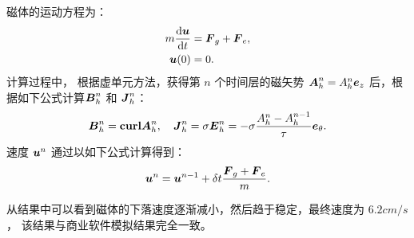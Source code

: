 \documentclass[notheorems,serif]{beamer}
\begin{document}
\begin{frame}
磁体的运动方程为：
$$
\begin{aligned}
    m\frac{\mathrm{d} \boldsymbol{u}}{\mathrm{d} t} & = \boldsymbol{F}_{g} + \boldsymbol{F}_{e},\\
\boldsymbol{u}(0) & = 0.
\end{aligned}
$$
计算过程中，
根据虚单元方法，获得第 $n$ 个时间层的磁矢势 $\boldsymbol{A}^n_h = A^n_h\boldsymbol{e}_z$ 后，根据如下公式计算$\boldsymbol{B}^n_h$ 和
$\boldsymbol{J}^n_h$：
$$
\boldsymbol{B}^n_h = \mathbf{curl} \boldsymbol{A}^n_h, \quad \boldsymbol{J}^n_h = \sigma\boldsymbol{E}^n_h = -\sigma
\frac{A^n_h - A^{n-1}_h}{\tau}\boldsymbol{e}_{\theta}.
$$
速度 $\boldsymbol{u}^n$ 通过以如下公式计算得到：
$$
\boldsymbol{u}^n = \boldsymbol{u}^{n-1} + \delta t \frac{\boldsymbol{F}_{g} + \boldsymbol{F}_{e}}{m}.
$$
\end{frame}

\begin{frame}
从结果中可以看到磁体的下落速度逐渐减小，然后趋于稳定，最终速度为
$6.2 cm/s$，
该结果与商业软件模拟结果完全一致。
\end{frame}
\end{document}
